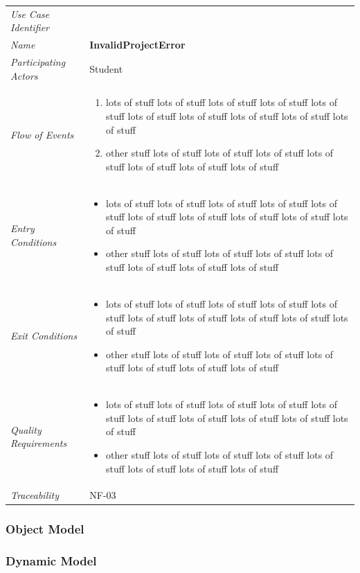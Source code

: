 \documentclass[12pt,letterpaper]{article}
\begin{document}
\begin{center}
	\begin{tabu} to 
		\toprule
		Use Case Identifier & \invalidprojecterror{} \\
		Name & {\bf InvalidProjectError} \\
		Participating Actors & Student \\
		Flow of Events & 
	    \begin{enumerate}[topsep=-1em]
		    \item lots of stuff lots of stuff lots of stuff lots of stuff lots of stuff lots of stuff lots of stuff lots of stuff lots of stuff lots of stuff
		    \item other stuff lots of stuff lots of stuff lots of stuff lots of stuff lots of stuff lots of stuff lots of stuff
		\end{enumerate} \\

		Entry Conditions &
		\begin{itemize}[topsep=-1em]
		    \item lots of stuff lots of stuff lots of stuff lots of stuff lots of stuff lots of stuff lots of stuff lots of stuff lots of stuff lots of stuff
		    \item other stuff lots of stuff lots of stuff lots of stuff lots of stuff lots of stuff lots of stuff lots of stuff
        \end{itemize} \\

		Exit Conditions &
		\begin{itemize}[topsep=-1em]
		    \item lots of stuff lots of stuff lots of stuff lots of stuff lots of stuff lots of stuff lots of stuff lots of stuff lots of stuff lots of stuff
		    \item other stuff lots of stuff lots of stuff lots of stuff lots of stuff lots of stuff lots of stuff lots of stuff
        \end{itemize} \\

		Quality Requirements &
		\begin{itemize}[topsep=-1em]
		    \item lots of stuff lots of stuff lots of stuff lots of stuff lots of stuff lots of stuff lots of stuff lots of stuff lots of stuff lots of stuff
		    \item other stuff lots of stuff lots of stuff lots of stuff lots of stuff lots of stuff lots of stuff lots of stuff
        \end{itemize} \\

		Traceability & NF-03 \\
		\toprule
	\end{tabu}
\end{center}

\subsubsection{Object Model}


\subsubsection{Dynamic Model}
\end{document}
